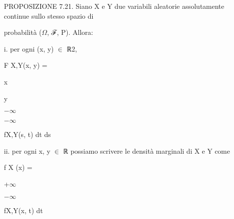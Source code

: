 \documentclass[a4paper,portrait,12pt]{article}
\begin{document}
\begin{flushleft}
PROPOSIZIONE 7.21. Siano X e Y due variabili aleatorie assolutamente continue sullo stesso spazio di
\end{flushleft}


\begin{flushleft}
probabilit\`{a} ($\Omega$, ℱ, P). Allora:
\end{flushleft}


\begin{flushleft}
i. per ogni (x, y) $\in$ ℝ2,
\end{flushleft}


\begin{flushleft}
F X,Y(x, y) =
\end{flushleft}





\begin{flushleft}
x
\end{flushleft}





\begin{flushleft}
y
\end{flushleft}





$-$$\infty$





$-$$\infty$





\begin{flushleft}
fX,Y(s, t) dt ds
\end{flushleft}





\begin{flushleft}
ii. per ogni x, y $\in$ ℝ possiamo scrivere le densit\`{a} marginali di X e Y come
\end{flushleft}


\begin{flushleft}
f X (x) =
\end{flushleft}





+$\infty$


$-$$\infty$





\begin{flushleft}
fX,Y(x, t) dt
\end{flushleft}
\end{document}
